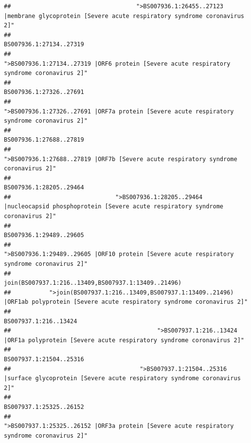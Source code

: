\documentclass[
]{article}
\begin{document}
\begin{verbatim}
##                                    ">BS007936.1:26455..27123 |membrane glycoprotein [Severe acute respiratory syndrome coronavirus 2]" 
##                                                                                                                BS007936.1:27134..27319 
##                                             ">BS007936.1:27134..27319 |ORF6 protein [Severe acute respiratory syndrome coronavirus 2]" 
##                                                                                                                BS007936.1:27326..27691 
##                                            ">BS007936.1:27326..27691 |ORF7a protein [Severe acute respiratory syndrome coronavirus 2]" 
##                                                                                                                BS007936.1:27688..27819 
##                                                    ">BS007936.1:27688..27819 |ORF7b [Severe acute respiratory syndrome coronavirus 2]" 
##                                                                                                                BS007936.1:28205..29464 
##                              ">BS007936.1:28205..29464 |nucleocapsid phosphoprotein [Severe acute respiratory syndrome coronavirus 2]" 
##                                                                                                                BS007936.1:29489..29605 
##                                            ">BS007936.1:29489..29605 |ORF10 protein [Severe acute respiratory syndrome coronavirus 2]" 
##                                                                                    join(BS007937.1:216..13409,BS007937.1:13409..21496) 
##           ">join(BS007937.1:216..13409,BS007937.1:13409..21496) |ORF1ab polyprotein [Severe acute respiratory syndrome coronavirus 2]" 
##                                                                                                                  BS007937.1:216..13424 
##                                          ">BS007937.1:216..13424 |ORF1a polyprotein [Severe acute respiratory syndrome coronavirus 2]" 
##                                                                                                                BS007937.1:21504..25316 
##                                     ">BS007937.1:21504..25316 |surface glycoprotein [Severe acute respiratory syndrome coronavirus 2]" 
##                                                                                                                BS007937.1:25325..26152 
##                                            ">BS007937.1:25325..26152 |ORF3a protein [Severe acute respiratory syndrome coronavirus 2]" 

\end{verbatim}
\end{document}
